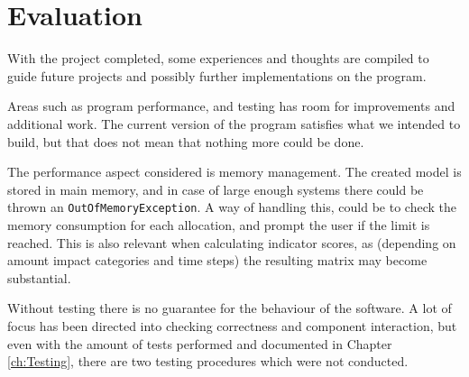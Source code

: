 \chapter{Evaluation} \label{ch:Evaluation}

With the project completed, some experiences and thoughts are compiled to guide future projects and possibly further implementations on the program.

Areas such as program performance, and testing has room for improvements and additional work. The current version of the program satisfies what we intended to build, but that does not mean that nothing more could be done.

The performance aspect considered is memory management. The created model is stored in main memory, and in case of large enough systems there could be thrown an \texttt{OutOfMemoryException}. A way of handling this, could be to check the memory consumption for each allocation, and prompt the user if the limit is reached. This is also relevant when calculating indicator scores, as (depending on amount impact categories and time steps) the resulting matrix may become substantial.





Without testing there is no guarantee for the behaviour of the software. A lot of focus has been directed into checking correctness and component interaction, but even with the amount of tests performed and documented in Chapter \ref{ch:Testing}, there are two testing procedures which were not conducted.

